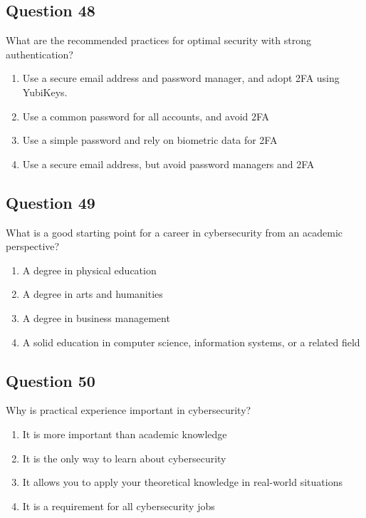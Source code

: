 \documentclass[12pt,a4paper]{article}
\begin{document}
\bigskip


\subsection*{Question 48}
What are the recommended practices for optimal security with strong authentication?

\begin{enumerate}[label=\Alph*., leftmargin=*]
\item Use a secure email address and password manager, and adopt 2FA using YubiKeys.
\item Use a common password for all accounts, and avoid 2FA
\item Use a simple password and rely on biometric data for 2FA
\item Use a secure email address, but avoid password managers and 2FA
\end{enumerate}

\bigskip


\subsection*{Question 49}
What is a good starting point for a career in cybersecurity from an academic perspective?

\begin{enumerate}[label=\Alph*., leftmargin=*]
\item A degree in physical education
\item A degree in arts and humanities
\item A degree in business management
\item A solid education in computer science, information systems, or a related field
\end{enumerate}

\bigskip


\subsection*{Question 50}
Why is practical experience important in cybersecurity?

\begin{enumerate}[label=\Alph*., leftmargin=*]
\item It is more important than academic knowledge
\item It is the only way to learn about cybersecurity
\item It allows you to apply your theoretical knowledge in real-world situations
\item It is a requirement for all cybersecurity jobs
\end{enumerate}
\end{document}
